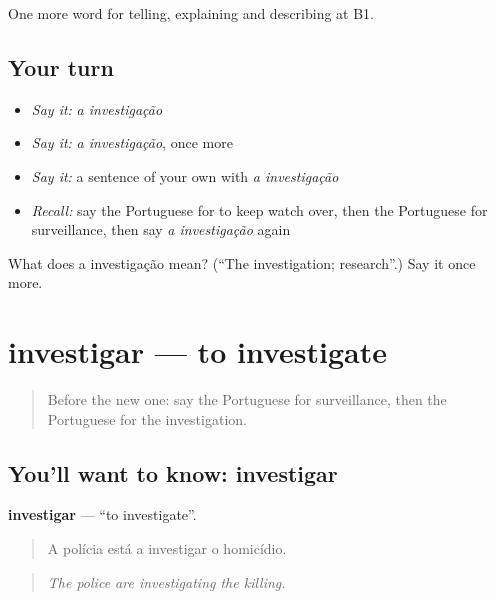 \begin{grammarlens}[title={What you've built}]
One more word for telling, explaining and describing at B1.
\end{grammarlens}

\subsection*{Your turn}
\begin{itemize}
\raggedright
  \item \emph{Say it:} \emph{a investigação}
  \item \emph{Say it:} \emph{a investigação}, once more
  \item \emph{Say it:} a sentence of your own with \emph{a investigação}
  \item \emph{Recall:} say the Portuguese for to keep watch over, then the Portuguese for surveillance, then say \emph{a investigação} again
\end{itemize}

\begin{tcolorbox}[breakable,colback=teal!4,colframe=teal!35!black,title={Before you move on}]
What does a investigação mean? (\textquotedblleft{}The investigation; research\textquotedblright{}.) Say it once more.
\end{tcolorbox}
\section[investigar]{investigar — to investigate}

\label{lesson:PT-C294-investigar}



\begin{quote}
Before the new one: say the Portuguese for surveillance, then the Portuguese for the investigation.
\end{quote}

\subsection*{You'll want to know: investigar}
\textbf{investigar} — \textquotedblleft{}to investigate\textquotedblright{}.

\begin{quote}
A polícia está a investigar o homicídio.
\end{quote}

\begin{quote}
\emph{The police are investigating the killing.}
\end{quote}

